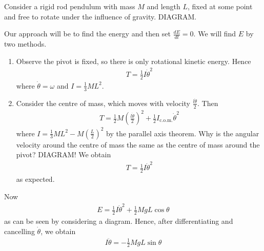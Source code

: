 \documentclass{../template/note}
\begin{document}
    \begin{example*}[Pendulum]
        Consider a rigid rod pendulum with mass \(M\) and length \(L\), fixed at some point and free to rotate under the influence of gravity. DIAGRAM.

        Our approach will be to find the energy and then set \(\frac{dE}{dt} = 0\). We will find \(E\) by two methods.

        \begin{enumerate}[label=\protect\circled{\arabic*}]
            \item Observe the pivot is fixed, so there is only rotational kinetic energy. Hence
            \begin{align*}
                T = \frac 1 2 I\dot \theta^2
            \end{align*}
            where \(\dot \theta = \omega\) and \(I = \frac 1 3 ML^2\).
            \item Consider the centre of mass, which moves with velocity \(\frac{l\dot \theta} 2\). Then
            \begin{align*}
                T = \frac 1 2 M\left(\frac{l\dot \theta}{2}\right)^2 + \frac 1 2 I_\text{c.o.m.}\dot \theta^2
            \end{align*}
            where \(I = \frac 1 3 ML^2 - M\left(\frac L 2\right)^2\) by the parallel axis theorem. Why is the angular velocity around the centre of mass the same as the centre of mass around the pivot? DIAGRAM!
            We obtain
            \begin{align*}
                T = \frac 1 2 I \dot \theta^2
            \end{align*}
            as expected.           
        \end{enumerate}
        Now
        \begin{align*}
            E = \frac 1 2 I \dot \theta^2 + \frac 1 2 MgL \cos \theta
        \end{align*}
        as can be seen by considering a diagram. Hence, after differentiating and cancelling \(\dot \theta\), we obtain
        \begin{align*}
            I \ddot \theta = -\frac 1 2 MgL \sin \theta
        \end{align*}
    \end{example*}
    
\end{document}
